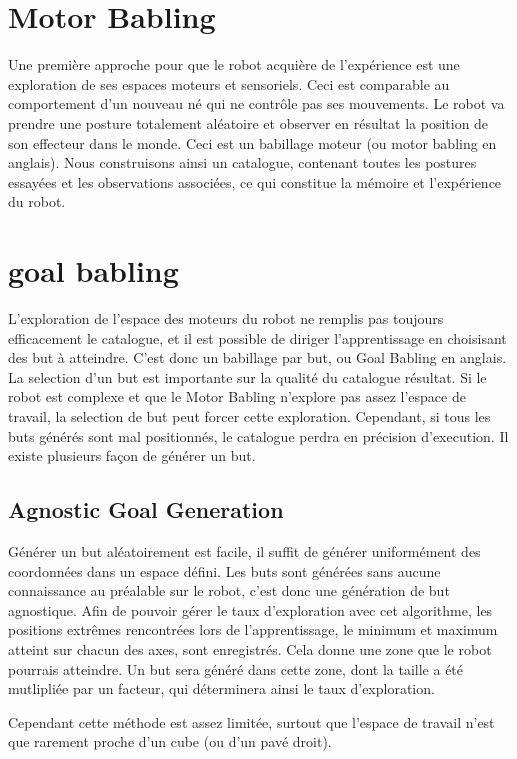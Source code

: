 \documentclass[11pt,french]{report}
\begin{document}
\section{Motor Babling}

Une première approche pour que le robot acquière de l'expérience est une exploration de ses espaces moteurs et sensoriels. Ceci est comparable au comportement d'un nouveau né qui ne contrôle pas ses mouvements. Le robot va prendre une posture totalement aléatoire et observer en résultat la position de son effecteur dans le monde. Ceci est un babillage moteur (ou motor babling en anglais). Nous construisons ainsi un catalogue, contenant toutes les postures essayées et les observations associées, ce qui constitue la mémoire et l'expérience du robot.

\section{goal babling}

L'exploration de l'espace des moteurs du robot ne remplis pas toujours efficacement le catalogue, et il est possible de diriger l'apprentissage en choisisant des but à atteindre. C'est donc un babillage par but, ou Goal Babling en anglais. La selection d'un but est importante sur la qualité du catalogue résultat. Si le robot est complexe et que le Motor Babling n'explore pas assez l'espace de travail, la selection de but peut forcer cette exploration. Cependant, si tous les buts générés sont mal positionnés, le catalogue perdra en précision d'execution. Il existe plusieurs façon de générer un but.

\subsection{Agnostic Goal Generation}

Générer un but aléatoirement est facile, il suffit de générer uniformément des coordonnées dans un espace défini. Les buts sont générées sans aucune connaissance au préalable sur le robot, c'est donc une génération de but agnostique. Afin de pouvoir gérer le taux d'exploration avec cet algorithme, les positions extrêmes rencontrées lors de l'apprentissage, le minimum et maximum atteint sur chacun des axes, sont enregistrés. Cela donne une zone que le robot pourrais atteindre. Un but sera généré dans cette zone, dont la taille a été mutlipliée par un facteur, qui déterminera ainsi le taux d'exploration.

Cependant cette méthode est assez limitée, surtout que l'espace de travail n'est que rarement proche d'un cube (ou d'un pavé droit).
\end{document}

